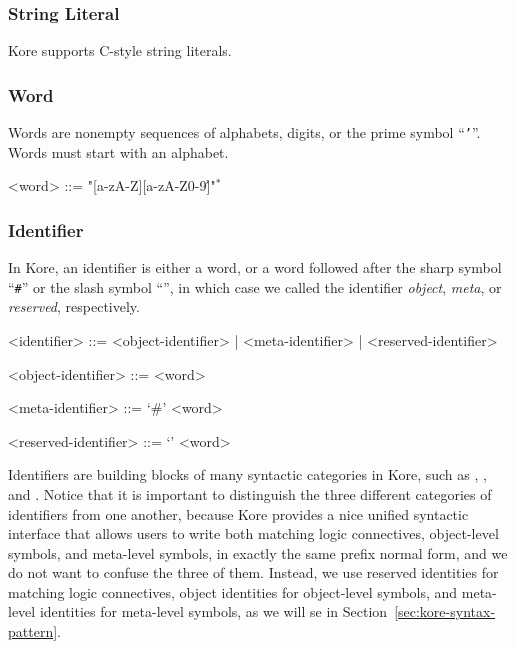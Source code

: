 \documentclass[UTF8,11pt]{article}
\theoremstyle{plain}
\theoremstyle{definition}
\theoremstyle{remark}
\newcommand{\sharpsymbol}{\#}
\newcommand{\slashsymbol}{\symbol{92}}
\newcommand{\syntacc}[1]{\text{$\langle$\textit{#1}$\rangle$}}
\begin{document}
\subsubsection{String Literal}
Kore supports C-style string literals.

\subsubsection{Word}
Words are nonempty sequences of alphabets, digits, or the prime symbol
``\texttt{'}''.
Words must start with an alphabet.
\begin{grammar}\small\centering
	<word> ::= "[a-zA-Z][a-zA-Z0-9\']"$^*$
\end{grammar}

\subsubsection{Identifier}
In Kore, an identifier is either a word, or a word followed after the sharp 
symbol
``\texttt{\sharpsymbol}'' or the slash symbol ``\texttt{\slashsymbol}'', in 
which case 
we called the identifier \emph{object}, \emph{meta}, or \emph{reserved}, 
respectively.

\begin{grammar}\small
	<identifier>    ::= 	<object-identifier>  | <meta-identifier> | 
	<reserved-identifier>

	<object-identifier> ::= <word> 
		
	<meta-identifier> ::= `\sharpsymbol' <word> 
		
	<reserved-identifier> ::= `\slashsymbol' <word>
\end{grammar}

Identifiers are building blocks of many syntactic categories in Kore, such as 
\syntacc{sort}, \syntacc{symbol}, and \syntacc{pattern}.
Notice that it is important to distinguish the three different categories of 
identifiers from one another,
because Kore provides a nice unified syntactic interface that allows users to 
write both matching logic connectives, object-level symbols, and meta-level 
symbols, in 
exactly the same prefix normal form,
and we do not want to confuse the three of them.
Instead, we use reserved identities for matching logic connectives, object 
identities for object-level symbols, and meta-level identities for meta-level 
symbols, as we will se in Section~\ref{sec:kore-syntax-pattern}.
\end{document}
